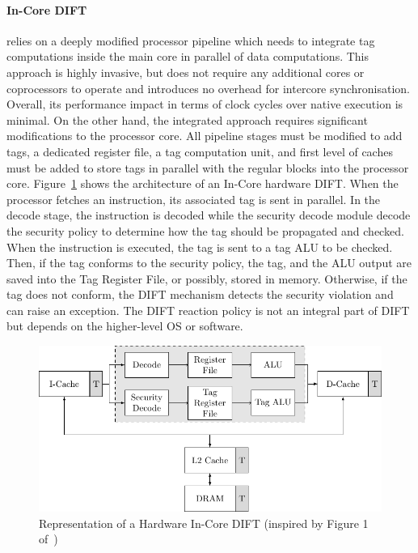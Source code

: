 \paragraph{In-Core DIFT} relies on a deeply modified processor pipeline which needs to integrate tag computations inside the main core in parallel of data computations. This approach is highly invasive, but does not require any additional cores or coprocessors to operate and introduces no overhead for intercore synchronisation. Overall, its performance impact in terms of clock cycles over native execution is minimal. On the other hand, the integrated approach requires significant modifications to the processor core. All pipeline stages must be modified to add tags, a dedicated register file, a tag computation unit, and first level of caches must be added to store tags in parallel with the regular blocks into the processor core. Figure~\ref{fig:incore_dift} shows the architecture of an In-Core hardware DIFT. When the processor fetches an instruction, its associated tag is sent in parallel. In the decode stage, the instruction is decoded while the security decode module decode the security policy to determine how the tag should be propagated and checked. When the instruction is executed, the tag is sent to a tag ALU to be checked. Then, if the tag conforms to the security policy, the tag, and the ALU output are saved into the Tag Register File, or possibly, stored in memory. Otherwise, if the tag does not conform, the DIFT mechanism detects the security violation and can raise an exception. The DIFT reaction policy is not an integral part of DIFT but depends on the higher-level OS or software.

\begin{figure}[ht]
    \centering
    \includegraphics{c2_soa/img/incore.pdf}
    \caption{Representation of a Hardware In-Core DIFT (inspired by Figure 1 of~\cite{KDK-09-dsn})}
    \label{fig:incore_dift}
\end{figure}

